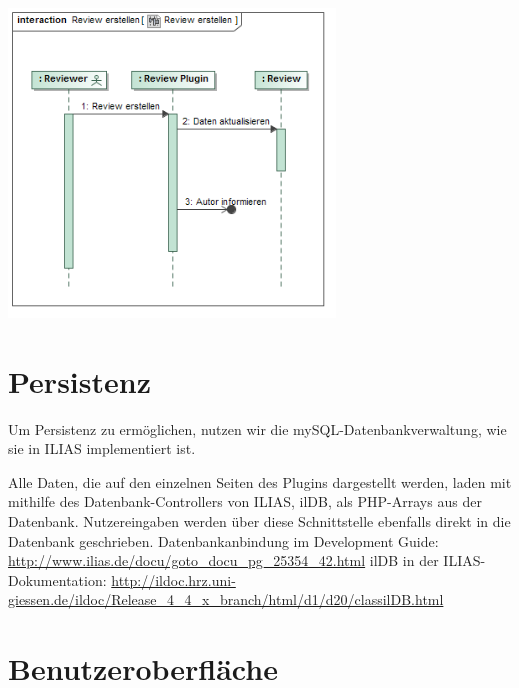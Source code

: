 \documentclass[a4paper]{scrreprt}
\begin{document}
\includegraphics[width=0.65\textwidth]{Sequence_Diagram__Review_erstellen__Review_erstellen.png}
\label{Review beenden}

\section{Persistenz}

Um Persistenz zu ermöglichen, nutzen wir die mySQL-Datenbankverwaltung, wie sie in ILIAS implementiert ist. 

Alle Daten, die auf den einzelnen Seiten des Plugins dargestellt werden, laden mit mithilfe des Datenbank-Controllers von ILIAS, ilDB, als PHP-Arrays aus der Datenbank. 
Nutzereingaben werden über diese Schnittstelle ebenfalls direkt in die Datenbank geschrieben.
Datenbankanbindung im Development Guide: \url{http://www.ilias.de/docu/goto_docu_pg_25354_42.html}
ilDB in der ILIAS-Dokumentation: \url{http://ildoc.hrz.uni-giessen.de/ildoc/Release_4_4_x_branch/html/d1/d20/classilDB.html}

\section{Benutzeroberfläche}

\centering
\end{document}
